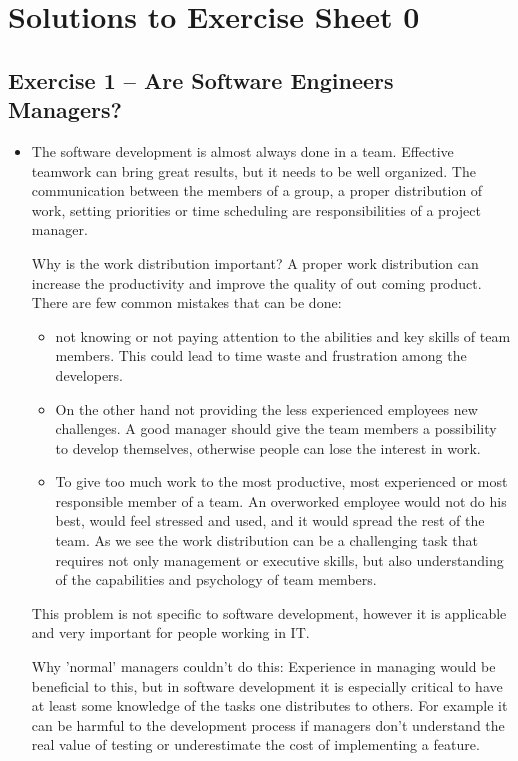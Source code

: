\documentclass{scrartcl}
\begin{document}
\section*{Solutions to Exercise Sheet 0}

\subsection*{Exercise 1 – Are Software Engineers Managers?}
\begin{itemize}
\item The software development is almost always done in a team.
Effective teamwork can bring great results, but it needs to be well organized.
The communication between the members of a group, a proper distribution of work,
setting priorities or time scheduling are responsibilities of a project manager.

Why is the work distribution important?
A proper work distribution can increase the productivity and improve the quality of out coming product.
There are few common mistakes that can be done:
\begin{itemize}
\item not knowing or not paying attention to the abilities and key skills of team members.
This could lead to time waste and frustration among the developers.
\item On the other hand not providing the less experienced employees new challenges.
A good manager should give the team members a possibility to develop themselves,
otherwise people can lose the interest in work.
\item To give too much work to the most productive, most experienced or most responsible member of a team.
An overworked employee would not do his best, would feel stressed and used, and it would spread the rest of the team.
As we see the work distribution can be a challenging task that requires not only management or executive skills,
but also understanding of the capabilities and psychology of team members.
\end{itemize}
This problem is not specific to software development,
however it is applicable and very important for people working in IT.

Why 'normal' managers couldn't do this:
Experience in managing would be beneficial to this, but in software development it is especially critical
to have at least some knowledge of the tasks one distributes to others. For example it can be harmful to
the development process if managers don't understand the real value of testing or underestimate the cost
of implementing a feature.


\end{itemize}
\end{document}
